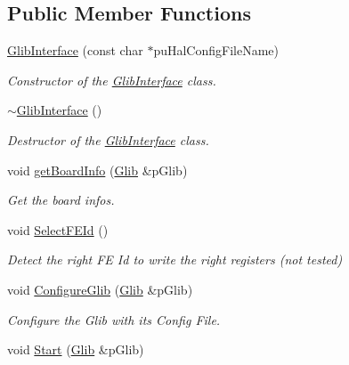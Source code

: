 \subsection*{Public Member Functions}
\begin{DoxyCompactItemize}
\item 
\hyperlink{class_ph2___hw_interface_1_1_glib_interface_a4aebde48748debad7e261c654c2c6fd8}{Glib\-Interface} (const char $\ast$pu\-Hal\-Config\-File\-Name)
\begin{DoxyCompactList}\small\item\em Constructor of the \hyperlink{class_ph2___hw_interface_1_1_glib_interface}{Glib\-Interface} class. \end{DoxyCompactList}\item 
\hyperlink{class_ph2___hw_interface_1_1_glib_interface_a1182c81cb29bca33b23a2c9f662df2ed}{$\sim$\-Glib\-Interface} ()
\begin{DoxyCompactList}\small\item\em Destructor of the \hyperlink{class_ph2___hw_interface_1_1_glib_interface}{Glib\-Interface} class. \end{DoxyCompactList}\item 
void \hyperlink{class_ph2___hw_interface_1_1_glib_interface_a51dd2e5a8128fd01a41c4d6b204df948}{get\-Board\-Info} (\hyperlink{class_ph2___hw_description_1_1_glib}{Glib} \&p\-Glib)
\begin{DoxyCompactList}\small\item\em Get the board infos. \end{DoxyCompactList}\item 
void \hyperlink{class_ph2___hw_interface_1_1_glib_interface_a73d61c4a430d7a883948184400dfd8b4}{Select\-F\-E\-Id} ()
\begin{DoxyCompactList}\small\item\em Detect the right F\-E Id to write the right registers (not tested) \end{DoxyCompactList}\item 
void \hyperlink{class_ph2___hw_interface_1_1_glib_interface_aad68569190ea9b318b5be1abae4fd23f}{Configure\-Glib} (\hyperlink{class_ph2___hw_description_1_1_glib}{Glib} \&p\-Glib)
\begin{DoxyCompactList}\small\item\em Configure the Glib with its Config File. \end{DoxyCompactList}\item 
void \hyperlink{class_ph2___hw_interface_1_1_glib_interface_a0706eb396293fe5c8c717c5d0ab82165}{Start} (\hyperlink{class_ph2___hw_description_1_1_glib}{Glib} \&p\-Glib)

\end{DoxyCompactItemize}
